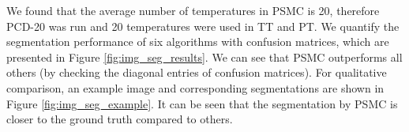 We found that the average number of temperatures in PSMC is 20, therefore PCD-20 was run and 20 temperatures were used in TT and PT. We quantify the segmentation performance of 
six algorithms with confusion matrices, which are presented in Figure \ref{fig:img_seg_results}. We can see that PSMC outperforms all others (by checking the diagonal entries of confusion matrices).      
For qualitative comparison, an example image and corresponding segmentations are shown in Figure \ref{fig:img_seg_example}.  It can be seen that the segmentation by PSMC is closer to the ground truth 
compared to others. 
\begin{figure}[t!] 
    \centering

\end{figure}
